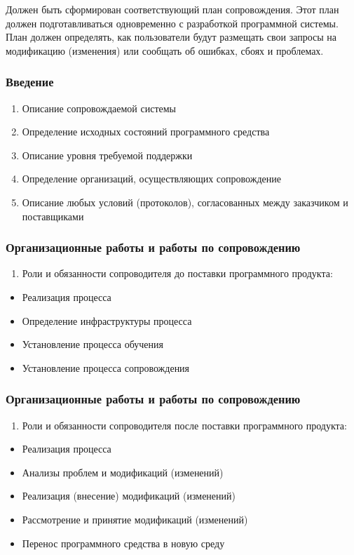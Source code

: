 \documentclass{industrial-development}
\begin{document}
\lecturenotes
Должен быть сформирован соответствующий план сопровождения. Этот план должен подготавливаться одновременно с разработкой программной системы. План должен определять, как пользователи будут размещать свои запросы на модификацию (изменения) или сообщать об ошибках, сбоях и проблемах. 

\begin{frame} \frametitle{Введение}
	\begin{enumerate}
		\item Описание сопровождаемой системы
		\item Определение исходных состояний программного средства 
		\item Описание уровня требуемой поддержки
		\item Определение организаций, осуществляющих сопровождение 
		\item Описание любых условий (протоколов), согласованных между заказчиком и поставщиками 
	\end{enumerate}
\end{frame}

\lecturenotes


\begin{frame} \frametitle{Организационные работы и работы по сопровождению}
	\begin{enumerate} \item Роли и обязанности сопроводителя до поставки программного продукта:\end{enumerate}
	\begin{itemize}
	\item Реализация процесса 
	\item Определение инфраструктуры процесса 
	\item Установление процесса обучения 
	\item Установление процесса сопровождения 
	\end{itemize}
\end{frame}

\lecturenotes

\begin{frame} \frametitle{Организационные работы и работы по сопровождению}
	\begin{enumerate}[2] \item Роли и обязанности сопроводителя после поставки программного продукта:  \end{enumerate}
	\begin{itemize}
		\item Реализация процесса
		\item Анализы проблем и модификаций (изменений)  
		\item Реализация (внесение) модификаций (изменений) 
		\item Рассмотрение и принятие модификаций (изменений) 
		\item Перенос программного средства в новую среду
	\end{itemize}
\end{frame}
\end{document}
